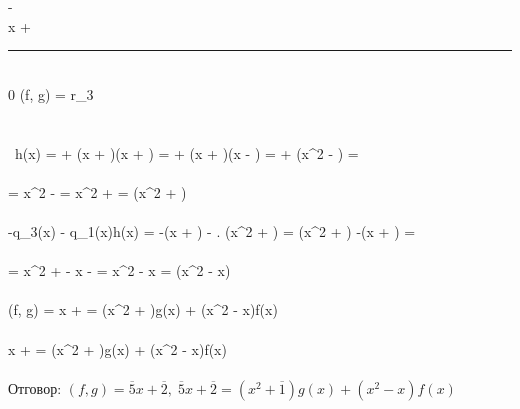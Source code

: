 \documentclass[14pt]{extarticle}
\newcommand\tab[1][1cm]{\hspace*{#1}}
\begin{document}
\tab - \\
\tab \tab {}x +  \\
\tab \tab \noindent\rule{1.6cm}{0.4pt} \\
\tab \tab \tab 0 \quad \implies (f, g) = r_3 \\\\\\\
h(x) =  + (x + )(x + ) =  + (x + )(x - ) =
\overline{1} + (x^2 - \overline{1}) = \\\\
= \overline{7}x^2 -  = x^2 +  = (x^2 + ) \implies \\\\
-q_3(x) - q_1(x)h(x) = -(x + ) - \overline{12} . (x^2 + ) = (x^2 + \overline{1}) -\overline{7}(x + ) = \\\\
= \overline{7}x^2 + \overline{7} - x - \overline{7} = \overline{7}x^2 - x = \overline{7}(x^2 - x) \implies \\\\
(f, g) = \overline{9}x +  = \overline{7}(x^2 + \overline{1})g(x) + \overline{7}(x^2 - x)f(x) \implies \\\\
\overline{5}x + \overline{2} = (x^2 + \overline{1})g(x) + (x^2 - x)f(x)\) \\\\
Отговор: \((f,g) = \overline{5}x + \overline{2}, \; \overline{5}x + \overline{2} = (x^2 + \overline{1})g(x) + (x^2 - x)f(x)\)
\end{document}
